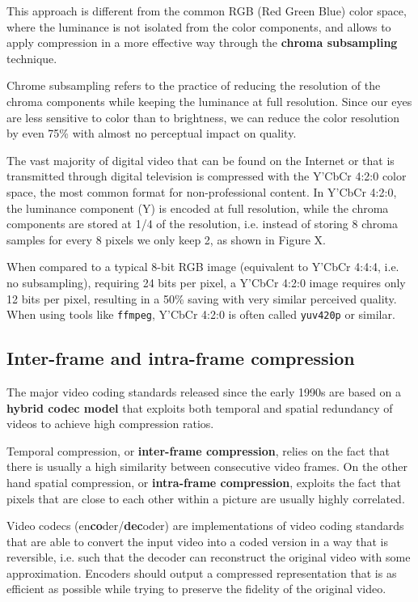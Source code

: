 This approach is different from the common RGB (Red Green Blue) color space, where the luminance is not isolated from the color components, and allows to apply compression in a more effective way through the \textbf{chroma subsampling} technique.

Chrome subsampling refers to the practice of reducing the resolution of the chroma components while keeping the luminance at full resolution. Since our eyes are less sensitive to color than to brightness, we can reduce the color resolution by even 75\% with almost no perceptual impact on quality.


The vast majority of digital video that can be found on the Internet or that is transmitted through digital television is compressed with the Y'CbCr 4:2:0 color space, the most common format for non-professional content. In Y'CbCr 4:2:0, the luminance component (Y) is encoded at full resolution, while the chroma components are stored at 1/4 of the resolution, i.e. instead of storing 8 chroma samples for every 8 pixels we only keep 2, as shown in Figure X.


When compared to a typical 8-bit RGB image (equivalent to Y'CbCr 4:4:4, i.e. no subsampling), requiring 24 bits per pixel, a Y'CbCr 4:2:0 image requires only 12 bits per pixel, resulting in a 50\% saving with very similar perceived quality. When using tools like \texttt{ffmpeg}, Y'CbCr 4:2:0 is often called \texttt{yuv420p} or similar.

\subsection{Inter-frame and intra-frame compression}
\label{sec:bg/compression/intra-inter}

The major video coding standards released since the early 1990s are based on a \textbf{hybrid codec model} that exploits both temporal and spatial redundancy of videos to achieve high compression ratios.

Temporal compression, or \textbf{inter-frame compression}, relies on the fact that there is usually a high similarity between consecutive video frames. On the other hand spatial compression, or \textbf{intra-frame compression}, exploits the fact that pixels that are close to each other within a picture are usually highly correlated.

Video codecs (en\textbf{co}der/\textbf{dec}oder) are implementations of video coding standards that are able to convert the input video into a coded version in a way that is reversible, i.e. such that the decoder can reconstruct the original video with some approximation. Encoders should output a compressed representation that is as efficient as possible while trying to preserve the fidelity of the original video.

